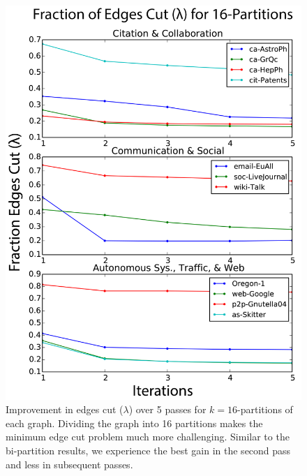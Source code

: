 \begin{figure}[h!]
\centering
\includegraphics[width=0.9\columnwidth] {figures/real_k16_lambda.pdf}
\caption[Caption for]{Improvement in edges cut ($\lambda$) over 5 passes for $k=16$-partitions of each graph. Dividing the graph into 16 partitions makes the minimum edge cut problem much more challenging. Similar to the bi-partition results, we experience the best gain in the second pass and less in subsequent passes.}
\label{fig:02}
\end{figure}



